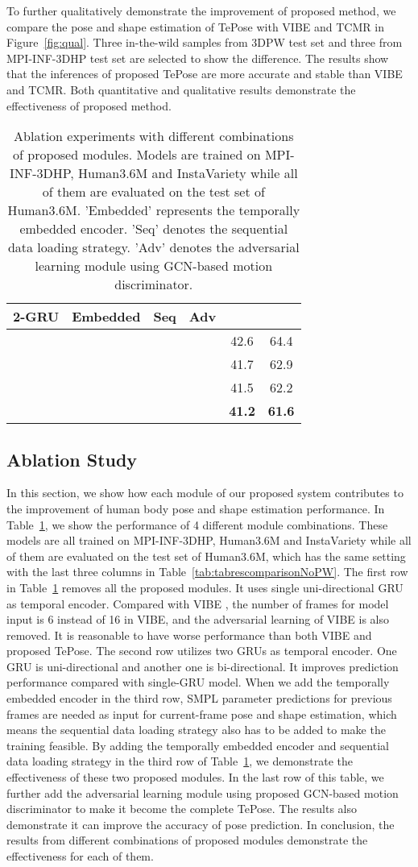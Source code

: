 \documentclass[10pt,twocolumn,letterpaper]{article}
\newcommand{\tabablation}{
\begin{table}[h]
\centering
\small
{
\setlength\tabcolsep{2pt}
\begin{tabular}{c c c c | c c}
\toprule
2-GRU & Embedded & Seq & Adv
& \text{PA-MPJPE }
& \text{MPJPE }
\\
\midrule
\ding{55} & \ding{55} & \ding{55} & \ding{55} 
& 42.6 & 64.4
\\
\ding{51} & \ding{55} & \ding{55} & \ding{55} 
& 41.7 & 62.9
\\
\ding{51} & \ding{51} & \ding{51} & \ding{55} 
& 41.5 & 62.2
\\
\ding{51} & \ding{51} & \ding{51} & \ding{51} 
& \textbf{41.2} & \textbf{61.6}
\\
\bottomrule
\end{tabular}
}
\caption{Ablation experiments with different combinations of proposed modules. Models are trained on MPI-INF-3DHP, Human3.6M and InstaVariety while all of them are evaluated on the test set of Human3.6M. 'Embedded' represents the temporally embedded encoder. 'Seq' denotes the sequential data loading strategy. 'Adv' denotes the adversarial learning module using GCN-based motion discriminator.} 
\label{tab:tabablation}
\vspace{-.2in}
\end{table}
}
\newcommand{\figref}[1]{Figure~\ref{fig:#1}}
\newcommand{\tabref}[1]{Table~\ref{tab:#1}}
\begin{document}
To further qualitatively demonstrate the improvement of proposed method, we compare the pose and shape estimation of TePose with VIBE \cite{kocabas2020vibe} and TCMR \cite{choi2021beyond} in \figref{qual}. Three in-the-wild samples from 3DPW test set and three from MPI-INF-3DHP test set are selected to show the difference. The results show that the inferences of proposed TePose are more accurate and stable than VIBE and TCMR. Both quantitative and qualitative results demonstrate the effectiveness of proposed method.


\tabablation


\subsection{Ablation Study}
In this section, we show how each module of our proposed system contributes to the improvement of human body pose and shape estimation performance. In \tabref{tabablation}, we show the performance of 4 different module combinations. These models are all trained on MPI-INF-3DHP, Human3.6M and InstaVariety while all of them are evaluated on the test set of Human3.6M, which has the same setting with the last three columns in \tabref{tabrescomparisonNoPW}. The first row in \tabref{tabablation} removes all the proposed modules. It uses single uni-directional GRU as temporal encoder. Compared with VIBE \cite{kocabas2020vibe}, the number of frames for model input is 6 instead of 16 in VIBE, and the adversarial learning of VIBE is also removed. It is reasonable to have worse performance than both VIBE and proposed TePose. The second row utilizes two GRUs as temporal encoder. One GRU is uni-directional and another one is bi-directional. It improves prediction performance compared with single-GRU model. When we add the temporally embedded encoder in the third row, SMPL parameter predictions for previous frames are needed as input for current-frame pose and shape estimation, which means the sequential data loading strategy also has to be added to make the training feasible. By adding the temporally embedded encoder and sequential data loading strategy in the third row of \tabref{tabablation}, we demonstrate the effectiveness of these two proposed modules. In the last row of this table, we further add the adversarial learning module using proposed GCN-based motion discriminator to make it become the complete TePose. The results also demonstrate it can improve the accuracy of pose prediction. In conclusion, the results from different combinations of proposed modules demonstrate the effectiveness for each of them.
\end{document}
